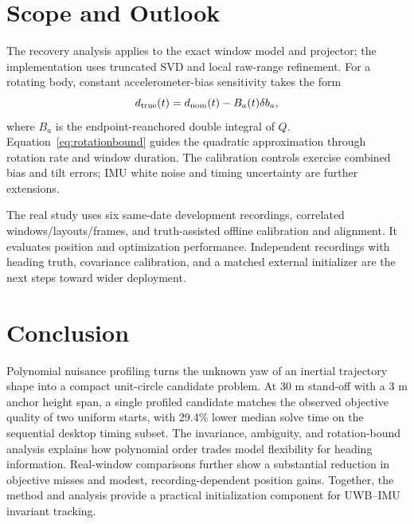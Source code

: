 \documentclass[conference,letterpaper,10pt]{IEEEtran}
\begin{document}
\section{Scope and Outlook}\label{sec:limits}
The recovery analysis applies to the exact window model and projector; the implementation uses truncated SVD and local raw-range refinement. For a rotating body, constant accelerometer-bias sensitivity takes the form
\begin{equation}
 d_{\rm true}(t)=d_{\rm nom}(t)-B_a(t)\delta b_a,
 \label{eq:fullbias}
\end{equation}
where $B_a$ is the endpoint-reanchored double integral of $Q$. Equation~\eqref{eq:rotationbound} guides the quadratic approximation through rotation rate and window duration. The calibration controls exercise combined bias and tilt errors; IMU white noise and timing uncertainty are further extensions.

The real study uses six same-date development recordings, correlated windows/layouts/frames, and truth-assisted offline calibration and alignment. It evaluates position and optimization performance. Independent recordings with heading truth, covariance calibration, and a matched external initializer are the next steps toward wider deployment.

\balance
\section{Conclusion}
Polynomial nuisance profiling turns the unknown yaw of an inertial trajectory shape into a compact unit-circle candidate problem. At 30 m stand-off with a 3 m anchor height span, a single profiled candidate matches the observed objective quality of two uniform starts, with 29.4\% lower median solve time on the sequential desktop timing subset. The invariance, ambiguity, and rotation-bound analysis explains how polynomial order trades model flexibility for heading information. Real-window comparisons further show a substantial reduction in objective misses and modest, recording-dependent position gains. Together, the method and analysis provide a practical initialization component for UWB--IMU invariant tracking.



\end{document}
